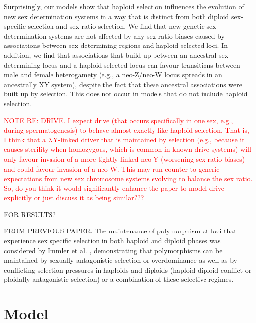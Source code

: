 \documentclass[12pt]{article}
\begin{document}
Surprisingly, our models show that haploid selection influences the evolution of new sex determination systems in a way that is distinct from both diploid sex-specific selection and sex ratio selection. 
We find that new genetic sex determination systems are not affected by any sex ratio biases caused by associations between sex-determining regions and haploid selected loci. 
In addition, we find that associations that build up between an ancestral sex-determining locus and a haploid-selected locus can favour transitions between male and female heterogamety (e.g., a neo-Z/neo-W locus spreads in an ancestrally XY system), despite the fact that these ancestral associations were built up by selection. 
This does not occur in models that do not include haploid selection. 



\textcolor{red}{NOTE RE: DRIVE. I expect drive (that occurs specifically in one sex, e.g., during spermatogenesis) to behave almost exactly like haploid selection. That is, I think that a XY-linked driver that is maintained by selection (e.g., because it causes sterility when homozygous, which is common in known drive systems) will only favour invasion of a more tightly linked neo-Y (worsening sex ratio biases) and could favour invasion of a neo-W. This may run counter to generic expectations from new sex chromosome systems evolving to balance the sex ratio. So, do you think it would significantly enhance the paper to model drive explicitly or just discuss it as being similar???}

{\color{blue} 
FOR RESULTS?

FROM PREVIOUS PAPER:
The maintenance of polymorphism at loci that experience sex specific selection in both haploid and diploid phases was considered by Immler et al. \cite{Immler:2012tl}, demonstrating that polymorphisms can be maintained by sexually antagonistic selection or overdominance as well as by conflicting selection pressures in haploids and diploids (haploid-diploid conflict or ploidally antagonistic selection) or a combination of these selective regimes.  
}


\section*{Model}
\end{document}

